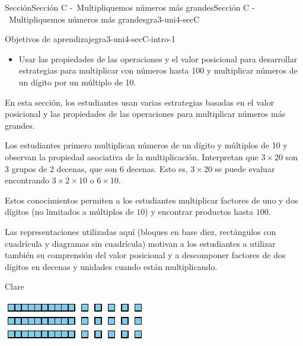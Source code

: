 \documentclass[oneside,10pt,]{article}
\begin{document}
%
%
\typeout{************************************************}
\typeout{************************************************}
%
\begin{sectionptx}{Sección}{Sección C -~Multipliquemos números más grandes}{}{Sección C -~Multipliquemos números más grandes}{}{}{gra3-uni4-secC}
\begin{introduction}{}%
\begin{objectives}{Objetivos de aprendizaje}{gra3-uni4-secC-intro-1}
%
\begin{itemize}[label=\textbullet]
\item{}Usar las propiedades de las operaciones y el valor posicional para desarrollar estrategias para multiplicar con números hasta 100 y multiplicar números de un dígito por un múltiplo de 10.%
\end{itemize}
\end{objectives}
En esta sección, los estudiantes usan varias estrategias basadas en el valor posicional y las propiedades de las operaciones para multiplicar números más grandes.%
\par
Los estudiantes primero multiplican números de un dígito y múltiplos de 10 y observan la propiedad asociativa de la multiplicación. Interpretan que \(3 \times 20\) son \(3\) grupos de \(2\) decenas, que son \(6\) decenas. Esto es, \(3 \times 20\) se puede evaluar encontrando \(3 \times 2 \times 10\) o \(6 \times 10\).%
\par
Estos conocimientos permiten a los estudiantes multiplicar factores de uno y dos dígitos (no limitados a múltiplos de \(10\)) y encontrar productos hasta \(100\).%
\par
Las representaciones utilizadas aquí (bloques en base diez, rectángulos con cuadrícula y diagramas sin cuadrícula) motivan a los estudiantes a utilizar también su comprensión del valor posicional y a descomponer factores de dos dígitos en decenas y unidades cuando están multiplicando.%
\begin{sidebyside}{3}{0}{0}{0.05}%
\begin{sbspanel}{0.3}%
Clare%
\par
\includegraphics[width=\linewidth]{external/svg-source/tikz-file-176318.pdf}

\end{sbspanel}
\end{sidebyside}
\end{introduction}
\end{sectionptx}
\end{document}
